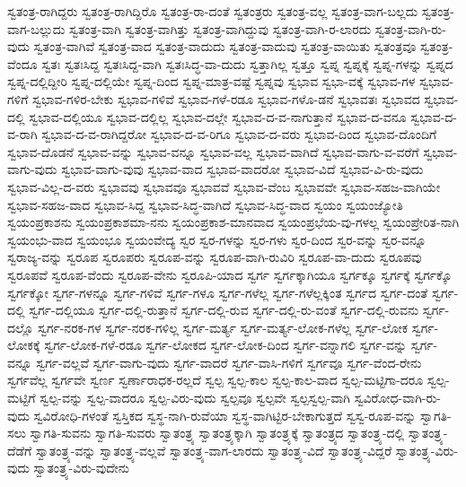 {ಸ್ವತಂತ್ರ-ರಾಗಿದ್ದರು
ಸ್ವತಂತ್ರ-ರಾಗಿದ್ದಿರೊ
ಸ್ವತಂತ್ರ-ರಾ-ದಂತೆ
ಸ್ವತಂತ್ರರು
ಸ್ವತಂತ್ರ-ವಲ್ಲ
ಸ್ವತಂತ್ರ-ವಾಗ-ಬಲ್ಲದು
ಸ್ವತಂತ್ರ-ವಾಗ-ಬಲ್ಲುದು
ಸ್ವತಂತ್ರ-ವಾಗಿ
ಸ್ವತಂತ್ರ-ವಾಗಿತ್ತು
ಸ್ವತಂತ್ರ-ವಾಗಿದ್ದುವು
ಸ್ವತಂತ್ರ-ವಾಗಿ-ರ-ಲಾರದು
ಸ್ವತಂತ್ರ-ವಾಗಿ-ರು-ವುದು
ಸ್ವತಂತ್ರ-ವಾಗಿವೆ
ಸ್ವತಂತ್ರ-ವಾದ
ಸ್ವತಂತ್ರ-ವಾದುದು
ಸ್ವತಂತ್ರ-ವಾದುವು
ಸ್ವತಂತ್ರ-ವಾಯಿತು
ಸ್ವತಂತ್ರವೂ
ಸ್ವತಂತ್ರ-ವೆಂದೂ
ಸ್ವತಃ
ಸ್ವತಃಸಿದ್ದ
ಸ್ವತಃಸಿದ್ದ-ವಾಗಿ
ಸ್ವತಃಸಿದ್ಧ-ವಾ-ದುದು
ಸ್ವತ್ತಾಗಿಲ್ಲ
ಸ್ವತ್ತೂ
ಸ್ವಪ್ನ
ಸ್ವಪ್ನಕ್ಕೆ
ಸ್ವಪ್ನ-ಗಳನ್ನು
ಸ್ವಪ್ನದ
ಸ್ವಪ್ನ-ದಲ್ಲಿದ್ದೀರಿ
ಸ್ವಪ್ನ-ದಲ್ಲಿಯೇ
ಸ್ವಪ್ನ-ದಿಂದ
ಸ್ವಪ್ನ-ಮಾತ್ರ-ವಷ್ಟೆ
ಸ್ವಪ್ನವು
ಸ್ವಭಾವ
ಸ್ವಭಾ-ವಕ್ಕೆ
ಸ್ವಭಾವ-ಗಳ
ಸ್ವಭಾವ-ಗಳಿಗೆ
ಸ್ವಭಾವ-ಗಳಿರ-ಬೇಕು
ಸ್ವಭಾವ-ಗಳಿವೆ
ಸ್ವಭಾವ-ಗಳೆ-ರಡೂ
ಸ್ವಭಾವ-ಗಳೊ-ಡನೆ
ಸ್ವಭಾವತಃ
ಸ್ವಭಾವದ
ಸ್ವಭಾವ-ದಲ್ಲಿ
ಸ್ವಭಾವ-ದಲ್ಲಿಯೂ
ಸ್ವಭಾವ-ದಲ್ಲಿಲ್ಲ
ಸ್ವಭಾವ-ದಲ್ಲೇ
ಸ್ವಭಾವ-ದ-ವ-ನಾಗುತ್ತಾನೆ
ಸ್ವಭಾವ-ದ-ವನೂ
ಸ್ವಭಾವ-ದ-ವ-ರಾಗಿ
ಸ್ವಭಾವ-ದ-ವ-ರಾಗಿದ್ದರೋ
ಸ್ವಭಾವ-ದ-ವ-ರಿಗೂ
ಸ್ವಭಾವ-ದ-ವರು
ಸ್ವಭಾವ-ದಿಂದ
ಸ್ವಭಾವ-ದೊಂದಿಗೆ
ಸ್ವಭಾವ-ದೊಡನೆ
ಸ್ವಭಾವ-ವನ್ನು
ಸ್ವಭಾವ-ವನ್ನೂ
ಸ್ವಭಾವ-ವಲ್ಲ
ಸ್ವಭಾವ-ವಾಗಿದೆ
ಸ್ವಭಾವ-ವಾಗು-ವ-ವರೆಗೆ
ಸ್ವಭಾವ-ವಾಗು-ವುದು
ಸ್ವಭಾವ-ವಾಗು-ವುವು
ಸ್ವಭಾವ-ವಾದ
ಸ್ವಭಾವ-ವಾದರೋ
ಸ್ವಭಾವ-ವಿದೆ
ಸ್ವಭಾವ-ವಿ-ರು-ವುದು
ಸ್ವಭಾವ-ವಿಲ್ಲ-ದ-ವರು
ಸ್ವಭಾವವು
ಸ್ವಭಾವವೂ
ಸ್ವಭಾವವೆ
ಸ್ವಭಾವ-ವೆಂಬ
ಸ್ವಭಾವವೇ
ಸ್ವಭಾವ-ಸಹಜ-ವಾಗಿಯೇ
ಸ್ವಭಾವ-ಸಹಜ-ವಾದ
ಸ್ವಭಾವ-ಸಿದ್ದ
ಸ್ವಭಾವ-ಸಿದ್ಧ-ವಾಗಿದೆ
ಸ್ವಭಾವ-ಸಿದ್ಧ-ವಾದ
ಸ್ವಯಂ
ಸ್ವಯಂಜ್ಯೋತಿ
ಸ್ವಯಂಪ್ರಕಾಶನು
ಸ್ವಯಂಪ್ರಕಾಶಮಾ-ನನು
ಸ್ವಯಂಪ್ರಕಾಶ-ಮಾನವಾದ
ಸ್ವಯಂಪ್ರಭೆಯ-ವು-ಗಳಲ್ಲ
ಸ್ವಯಂಪ್ರೇರಿತ-ನಾಗಿ
ಸ್ವಯಂಭು-ವಾದ
ಸ್ವಯಂಭೂ
ಸ್ವಯಂವೇದ್ಯ
ಸ್ವರ
ಸ್ವರ-ಗಳನ್ನು
ಸ್ವರ-ಗಳು
ಸ್ವರ-ದಿಂದ
ಸ್ವರ-ವನ್ನು
ಸ್ವರ-ವನ್ನೂ
ಸ್ವರಾಜ್ಯ-ವನ್ನು
ಸ್ವರೂಪ
ಸ್ವರೂಪರು
ಸ್ವರೂಪ-ವನ್ನು
ಸ್ವರೂಪ-ವಾಗಿ-ರುವಿರಿ
ಸ್ವರೂಪ-ವಾ-ದುದು
ಸ್ವರೂಪವು
ಸ್ವರೂಪವೆ
ಸ್ವರೂಪ-ವೆಂದು
ಸ್ವರೂಪ-ವೇನು
ಸ್ವರೂಪಿ-ಯಾದ
ಸ್ವರ್ಗ
ಸ್ವರ್ಗಕ್ಕಾಗಿಯೂ
ಸ್ವರ್ಗಕ್ಕೂ
ಸ್ವರ್ಗಕ್ಕೆ
ಸ್ವರ್ಗಕ್ಕೊ
ಸ್ವರ್ಗಕ್ಕೋ
ಸ್ವರ್ಗ-ಗಳನ್ನೂ
ಸ್ವರ್ಗ-ಗಳಿವೆ
ಸ್ವರ್ಗ-ಗಳೂ
ಸ್ವರ್ಗ-ಗಳೆಲ್ಲ
ಸ್ವರ್ಗ-ಗಳೆಲ್ಲಕ್ಕಿಂತ
ಸ್ವರ್ಗದ
ಸ್ವರ್ಗ-ದಂತೆ
ಸ್ವರ್ಗ-ದಲ್ಲಿ
ಸ್ವರ್ಗ-ದಲ್ಲಿಯೂ
ಸ್ವರ್ಗ-ದಲ್ಲಿ-ರುತ್ತಾನೆ
ಸ್ವರ್ಗ-ದಲ್ಲಿ-ರುವ
ಸ್ವರ್ಗ-ದಲ್ಲಿ-ರು-ವಂತೆ
ಸ್ವರ್ಗ-ದಲ್ಲಿ-ರುವನು
ಸ್ವರ್ಗ-ದಲ್ಲೊ
ಸ್ವರ್ಗ-ನರಕ-ಗಳ
ಸ್ವರ್ಗ-ನರಕ-ಗಳಿಲ್ಲ
ಸ್ವರ್ಗ-ಮರ್ತ್ಯ
ಸ್ವರ್ಗ-ಮರ್ತ್ಯ-ಲೋಕ-ಗಳೆಲ್ಲ
ಸ್ವರ್ಗ-ಲೋಕ
ಸ್ವರ್ಗ-ಲೋಕಕ್ಕೆ
ಸ್ವರ್ಗ-ಲೋಕ-ಗಳೆ-ರಡೂ
ಸ್ವರ್ಗ-ಲೋಕದ
ಸ್ವರ್ಗ-ಲೋಕ-ದಿಂದ
ಸ್ವರ್ಗ-ವನ್ನಾಗಲಿ
ಸ್ವರ್ಗ-ವನ್ನು
ಸ್ವರ್ಗ-ವನ್ನೂ
ಸ್ವರ್ಗ-ವಲ್ಲವೆ
ಸ್ವರ್ಗ-ವಾಗು-ವುದು
ಸ್ವರ್ಗ-ವಾದರೆ
ಸ್ವರ್ಗ-ವಾಸಿ-ಗಳಿಗೆ
ಸ್ವರ್ಗವೂ
ಸ್ವರ್ಗ-ವೆಂದ-ರೇನು
ಸ್ವರ್ಗವೆಲ್ಲ
ಸ್ವರ್ಗವೇ
ಸ್ವರ್ಣ
ಸ್ವರ್ಣಾರಾಧಕ-ರಲ್ಲದೆ
ಸ್ವಲ್ಪ
ಸ್ವಲ್ಪ-ಕಾಲ
ಸ್ವಲ್ಪ-ಕಾಲ-ವಾದ
ಸ್ವಲ್ಪ-ಮಟ್ಟಿಗಾ-ದರೂ
ಸ್ವಲ್ಪ-ಮಟ್ಟಿಗೆ
ಸ್ವಲ್ಪ-ವನ್ನು
ಸ್ವಲ್ಪ-ವಾದರೂ
ಸ್ವಲ್ಪ-ವಿರು-ವುದು
ಸ್ವಲ್ಪವೂ
ಸ್ವಲ್ಪವೇ
ಸ್ವಲ್ಪಸ್ವಲ್ಪ-ವಾಗಿ
ಸ್ವವಿರೋಧ-ವಾಗಿ-ರು-ವುದು
ಸ್ವವಿರೋಧಿ-ಗಳಂತೆ
ಸ್ವಸ್ತಿಕದ
ಸ್ವಸ್ಥ-ನಾಗಿ-ರುವೆಯಾ
ಸ್ವಸ್ಥ-ವಾಗಿಟ್ಟಿರ-ಬೇಕಾಗುತ್ತದೆ
ಸ್ವಸ್ವ-ರೂಪ-ವನ್ನು
ಸ್ವಾಗತಿ-ಸಲು
ಸ್ವಾಗತಿ-ಸುವನು
ಸ್ವಾಗತಿ-ಸುವರು
ಸ್ವಾತಂತ್ರ್ಯ
ಸ್ವಾತಂತ್ರ್ಯಕ್ಕಾಗಿ
ಸ್ವಾತಂತ್ರ್ಯಕ್ಕೆ
ಸ್ವಾತಂತ್ರ್ಯದ
ಸ್ವಾತಂತ್ರ್ಯ-ದಲ್ಲಿ
ಸ್ವಾತಂತ್ರ್ಯ-ದೆಡೆಗೆ
ಸ್ವಾತಂತ್ರ್ಯ-ವನ್ನು
ಸ್ವಾತಂತ್ರ್ಯ-ವಲ್ಲವೆ
ಸ್ವಾತಂತ್ರ್ಯ-ವಾಗ-ಲಾರದು
ಸ್ವಾತಂತ್ರ್ಯ-ವಿದೆ
ಸ್ವಾತಂತ್ರ್ಯ-ವಿದ್ದರೆ
ಸ್ವಾತಂತ್ರ್ಯ-ವಿರು-ವುದು
ಸ್ವಾತಂತ್ರ್ಯ-ವಿರು-ವುದೇನು
}
